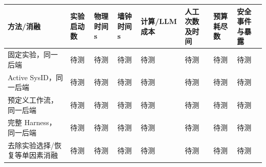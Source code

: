 \documentclass[
  chinese,
  11pt,
  a4paper,
  fontset=fandol]{ctexart}
\newcounter{none} %
\begin{document}
{\def\LTcaptype{none} %
\begin{longtable}[]{@{}
  >{\raggedright\arraybackslash}p{}
  >{\raggedright\arraybackslash}p{}
  >{\raggedright\arraybackslash}p{}
  >{\raggedright\arraybackslash}p{}
  >{\raggedright\arraybackslash}p{}
  >{\raggedright\arraybackslash}p{}
  >{\raggedright\arraybackslash}p{}
  >{\raggedright\arraybackslash}p{}@{}}
\toprule\noalign{}
\begin{minipage}[b]{\linewidth}\raggedright
方法/消融
\end{minipage} & \begin{minipage}[b]{\linewidth}\raggedright
实验启动数
\end{minipage} & \begin{minipage}[b]{\linewidth}\raggedright
物理时间 s
\end{minipage} & \begin{minipage}[b]{\linewidth}\raggedright
墙钟时间 s
\end{minipage} & \begin{minipage}[b]{\linewidth}\raggedright
计算/LLM 成本
\end{minipage} & \begin{minipage}[b]{\linewidth}\raggedright
人工次数及时间
\end{minipage} & \begin{minipage}[b]{\linewidth}\raggedright
预算耗尽数
\end{minipage} & \begin{minipage}[b]{\linewidth}\raggedright
安全事件与暴露
\end{minipage} \\
\midrule\noalign{}
\endhead
\bottomrule\noalign{}
\endlastfoot
固定实验，同一后端 & 待测 & 待测 & 待测 & 待测 & 待测 & 待测 & 待测 \\
Active SysID，同一后端 & 待测 & 待测 & 待测 & 待测 & 待测 & 待测 &
待测 \\
预定义工作流，同一后端 & 待测 & 待测 & 待测 & 待测 & 待测 & 待测 &
待测 \\
完整 Harness，同一后端 & 待测 & 待测 & 待测 & 待测 & 待测 & 待测 &
待测 \\
去除实验选择/恢复等单因素消融 & 待测 & 待测 & 待测 & 待测 & 待测 & 待测
& 待测 \\
\end{longtable}
}
\end{document}
